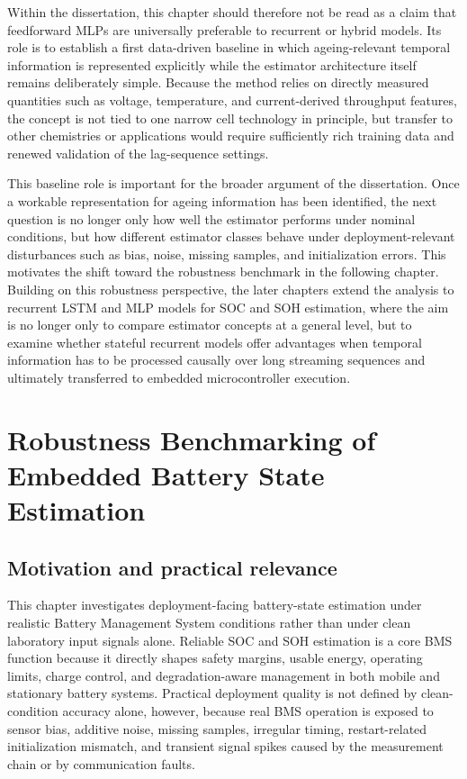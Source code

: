 \documentclass[
    a4paper,
    12pt,
    titlepage,
    bibliography=totoc,
    twoside=on,
    parskip=false,
    numbers=noenddot,
    cleardoublepage=empty,
    DIV=12,
    BCOR=12.0mm,
    headheight=36pt,
    headings=openright
]{scrreprt}
\begin{document}
Within the dissertation, this chapter should therefore not be read as a claim that feedforward MLPs are universally preferable to recurrent or hybrid models. Its role is to establish a first data-driven baseline in which ageing-relevant temporal information is represented explicitly while the estimator architecture itself remains deliberately simple. Because the method relies on directly measured quantities such as voltage, temperature, and current-derived throughput features, the concept is not tied to one narrow cell technology in principle, but transfer to other chemistries or applications would require sufficiently rich training data and renewed validation of the lag-sequence settings.

This baseline role is important for the broader argument of the dissertation. Once a workable representation for ageing information has been identified, the next question is no longer only how well the estimator performs under nominal conditions, but how different estimator classes behave under deployment-relevant disturbances such as bias, noise, missing samples, and initialization errors. This motivates the shift toward the robustness benchmark in the following chapter. Building on this robustness perspective, the later chapters extend the analysis to recurrent LSTM and MLP models for SOC and SOH estimation, where the aim is no longer only to compare estimator concepts at a general level, but to examine whether stateful recurrent models offer advantages when temporal information has to be processed causally over long streaming sequences and ultimately transferred to embedded microcontroller execution.

\chapter{Robustness Benchmarking of Embedded Battery State Estimation}
\section{Motivation and practical relevance}
This chapter investigates deployment-facing battery-state estimation under realistic Battery Management System conditions rather than under clean laboratory input signals alone. Reliable SOC and SOH estimation is a core BMS function because it directly shapes safety margins, usable energy, operating limits, charge control, and degradation-aware management in both mobile and stationary battery systems.\autocite{shrivastavaReviewTechnologicalAdvancement2023,guoSystematicReviewElectrochemical2024,yaoSmarterBatteryManagement2025b} Practical deployment quality is not defined by clean-condition accuracy alone, however, because real BMS operation is exposed to sensor bias, additive noise, missing samples, irregular timing, restart-related initialization mismatch, and transient signal spikes caused by the measurement chain or by communication faults.\autocite{liRobustnessSOCEstimation2015,naseriReliableWirelessBMS2025,bergerBenchmarkingBatteryManagement2024}
\end{document}
